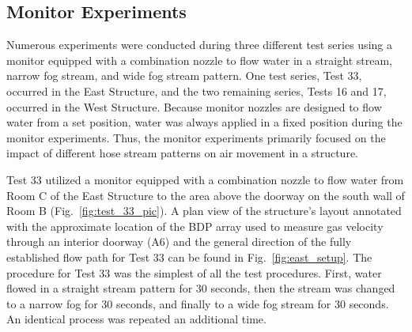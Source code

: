 \documentclass[12pt,oneside]{book}
\begin{document}
\subsection{Monitor Experiments}
\label{sec:monitor_procedure}
Numerous experiments were conducted during three different test series using a monitor equipped with a combination nozzle to flow water in a straight stream, narrow fog stream, and wide fog stream pattern. One test series, Test 33, occurred in the East Structure, and the two remaining series, Tests 16 and 17, occurred in the West Structure. Because monitor nozzles are designed to flow water from a set position, water was always applied in a fixed position during the monitor experiments. Thus, the monitor experiments primarily focused on the impact of different hose stream patterns on air movement in a structure.

Test 33 utilized a monitor equipped with a combination nozzle to flow water from Room C of the East Structure to the area above the doorway on the south wall of Room B (Fig.~\ref{fig:test_33_pic}). A plan view of the structure's layout annotated with the approximate location of the BDP array used to measure gas velocity through an interior doorway (A6) and the general direction of the fully established flow path for Test 33 can be found in Fig.~\ref{fig:east_setup}. The procedure for Test 33 was the simplest of all the test procedures. First, water flowed in a straight stream pattern for 30 seconds, then the stream was changed to a narrow fog for 30 seconds, and finally to a wide fog stream for 30 seconds. An identical process was repeated an additional time.
\end{document}
